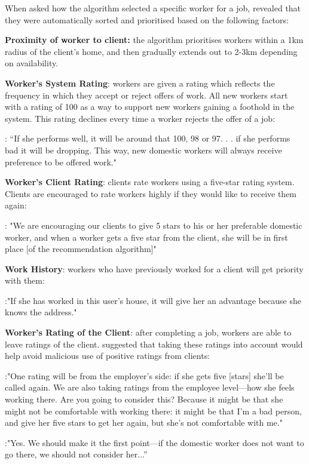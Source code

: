 When asked how the algorithm selected a specific worker for a job, \PC{} revealed that they were automatically sorted and prioritised based on the following factors:

\textbf{Proximity of worker to client:} the algorithm prioritises workers within a 1km radius of the client’s home, and then gradually extends out to 2-3km depending on availability.

\textbf{Worker's System Rating}:  workers are given a rating which reflects the frequency in which they accept or reject offers of work. All new workers start with a rating of 100 as a way to support new workers gaining a foothold in the \PC{} system. This rating declines every time a worker rejects the offer of a job:

\begin{displayquote}
\textbf{\PCTwo{}}: “If she performs well, it will be around that 100, 98 or 97. . . if she performs bad it will be dropping. This way, new domestic workers will always receive preference to be offered work."  
\end{displayquote}

\textbf{Worker's Client Rating}: clients rate workers using a five-star rating system. Clients are encouraged to rate workers highly if they would like to receive them again:

\begin{displayquote}
\textbf{\PCTwo{}}: "We are encouraging our clients to give 5 stars to his or her preferable domestic worker, and when a worker gets a five star from the client, she will be in first place [of the recommendation algorithm]"
\end{displayquote}

\textbf{Work History}: workers who have previously worked for a client will get priority with them:

\begin{displayquote}
\textbf{\PCTwo{}}:"If she has worked in this user’s house, it will give her an advantage because she knows the address."
\end{displayquote}

\textbf{Worker's Rating of the Client}: after completing a job, workers are able to leave ratings of the client. \NGOOne{} suggested that taking these ratings into account would help avoid malicious use of positive ratings from clients:

\begin{displayquote}
\textbf{\NGOOne{}}:"One rating will be from the employer’s side: if she gets five [stars] she’ll be called again. We are also taking ratings from the employee level---how she feels working there. Are you going to consider this? Because it might be that she might not be comfortable with working there: it might be that I’m a bad person, and give her five stars to get her again, but she’s not comfortable with me."

\textbf{\PCTwo{}}:"Yes. We should make it the first point---if the domestic worker does not want to go there, we should not consider her...”
\end{displayquote}

